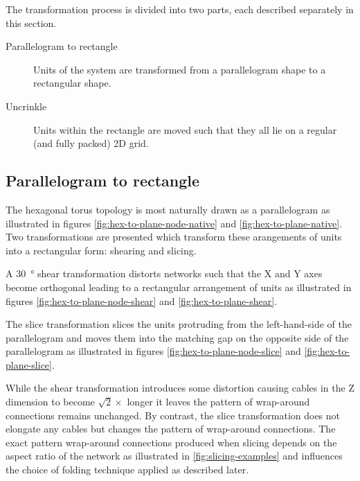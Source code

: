 		The transformation process is divided into two parts, each described
		separately in this section.
		
		\begin{description}
			
			\item[Parallelogram to rectangle] Units of the system are transformed
			from a parallelogram shape to a rectangular shape.
			
			\item[Uncrinkle] Units within the rectangle are moved such that they all
			lie on a regular (and fully packed) 2D grid.
			
		\end{description}
		
		\subsection{Parallelogram to rectangle}
			
			The hexagonal torus topology is most naturally drawn as a parallelogram
			as illustrated in figures \ref{fig:hex-to-plane-node-native} and
			\ref{fig:hex-to-plane-native}. Two transformations are presented which
			transform these arangements of units into a rectangular form: shearing
			and slicing.
			
			A \SI{30}{\degree} shear transformation distorts networks such that the X
			and Y axes become orthogonal leading to a rectangular arrangement of
			units as illustrated in figures \ref{fig:hex-to-plane-node-shear} and
			\ref{fig:hex-to-plane-shear}.
			
			The slice transformation slices the units protruding from the
			left-hand-side of the parallelogram and moves them into the matching gap
			on the opposite side of the parallelogram as illustrated in figures
			\ref{fig:hex-to-plane-node-slice} and \ref{fig:hex-to-plane-slice}.
			 
			While the shear transformation introduces some distortion causing cables
			in the Z dimension to become $\sqrt{2}\times$ longer it leaves the
			pattern of wrap-around connections remains unchanged. By contrast, the
			slice transformation does not elongate any cables but changes the pattern
			of wrap-around connections. The exact pattern wrap-around connections
			produced when slicing depends on the aspect ratio of the network as
			illustrated in \ref{fig:slicing-examples} and influences the choice of
			folding technique applied as described later.
			
